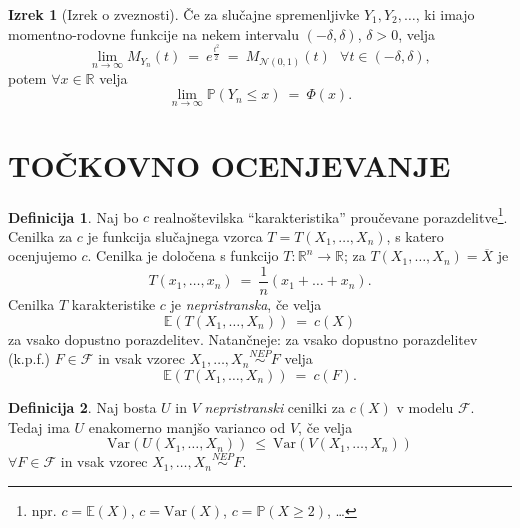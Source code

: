 \documentclass[11pt]{article}
\newcommand{\p}{\mathbb{P}}
\newcommand{\E}{\mathbb{E}}
\newcommand{\R}{\mathbb{R}}
\newcommand{\1}{\mathbbm{1}}
\newcommand{\n}{\mathcal{N}}
\newcommand{\F}{\mathcal{F}}
\theoremstyle{definition}
\newtheorem{definicija}{Definicija}[section]
\theoremstyle{definition}
\theoremstyle{definition}
\newtheorem{izrek}{Izrek}[section]
\begin{document}
\begin{izrek}[Izrek o zveznosti]

Če za slučajne spremenljivke $Y_1, Y_2, \ldots$, ki imajo momentno-rodovne funkcije na nekem intervalu $(-\delta, \delta)$, $\delta>0$, velja
$$\lim_{n \rightarrow \infty} M_{Y_n}(t) ~=~ e^{\frac{t^2}{2}} ~=~ M_{\n(0, 1)}(t) ~~~\forall t \in (-\delta, \delta),$$
potem $\forall x \in \R$ velja
$$\lim_{n \rightarrow \infty} \p(Y_n \leq x) ~=~ \Phi(x).$$

\end{izrek}
\vspace{0.5cm}

\pagebreak


\section{TOČKOVNO OCENJEVANJE}
\vspace{0.5cm}

\begin{definicija}

Naj bo $c$ realnoštevilska ``karakteristika'' proučevane \hbox{porazdelitve}\footnote{npr. $c = \E(X)$, $c = \text{Var}(X)$, $c = \p(X \geq 2)$, \ldots}. Cenilka za $c$ je funkcija slučajnega vzorca $T = T(X_1, \ldots, X_n)$, s katero ocenjujemo $c$. Cenilka je določena s funkcijo $T: \R^n \rightarrow \R$; za \hbox{$T(X_1, \ldots, X_n) = \overline{X}$} je
$$T(x_1, \ldots, x_n) ~=~ \frac{1}{n}(x_1 + \ldots + x_n).$$
Cenilka $T$ karakteristike $c$ je \textit{nepristranska}, če velja
$$\E(T(X_1, \ldots, X_n)) ~=~ c(X)$$
za vsako dopustno porazdelitev. Natančneje: za vsako dopustno \hbox{porazdelitev} (k.p.f.) $F \in \F$ in vsak vzorec $X_1, \ldots, X_n \overset{NEP}{\sim} F$ velja
$$\E(T(X_1, \ldots, X_n)) ~=~ c(F).$$

\end{definicija}
\vspace{0.5cm}

\begin{definicija}

Naj bosta $U$ in $V$ \textit{nepristranski} cenilki za $c(X)$ v modelu $\F$. Tedaj ima $U$ enakomerno manjšo varianco od $V$, če velja
$$\text{Var}(U(X_1, \ldots, X_n)) ~\leq~ \text{Var}(V(X_1, \ldots, X_n))$$
$\forall F \in \F$ in vsak vzorec $X_1, \ldots, X_n \overset{NEP}{\sim} F$.

\end{definicija}
\vspace{0.5cm}
\end{document}
